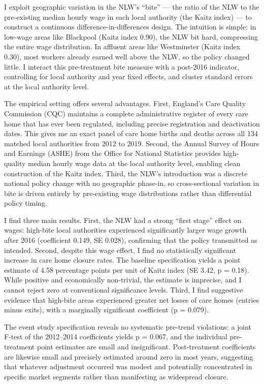 \documentclass[12pt]{article}
\begin{document}
I exploit geographic variation in the NLW's ``bite'' --- the ratio of the NLW to the pre-existing median hourly wage in each local authority (the Kaitz index) --- to construct a continuous difference-in-differences design. The intuition is simple: in low-wage areas like Blackpool (Kaitz index 0.90), the NLW bit hard, compressing the entire wage distribution. In affluent areas like Westminster (Kaitz index 0.30), most workers already earned well above the NLW, so the policy changed little. I interact this pre-treatment bite measure with a post-2016 indicator, controlling for local authority and year fixed effects, and cluster standard errors at the local authority level.

The empirical setting offers several advantages. First, England's Care Quality Commission (CQC) maintains a complete administrative register of every care home that has ever been regulated, including precise registration and deactivation dates. This gives me an exact panel of care home births and deaths across all 134 matched local authorities from 2012 to 2019. Second, the Annual Survey of Hours and Earnings (ASHE) from the Office for National Statistics provides high-quality median hourly wage data at the local authority level, enabling clean construction of the Kaitz index. Third, the NLW's introduction was a discrete national policy change with no geographic phase-in, so cross-sectional variation in bite is driven entirely by pre-existing wage distributions rather than differential policy timing.

I find three main results. First, the NLW had a strong ``first stage'' effect on wages: high-bite local authorities experienced significantly larger wage growth after 2016 (coefficient 0.149, SE 0.028), confirming that the policy transmitted as intended. Second, despite this wage effect, I find no statistically significant increase in care home closure rates. The baseline specification yields a point estimate of 4.58 percentage points per unit of Kaitz index (SE 3.42, p = 0.18). While positive and economically non-trivial, the estimate is imprecise, and I cannot reject zero at conventional significance levels. Third, I find suggestive evidence that high-bite areas experienced greater net losses of care homes (entries minus exits), with a marginally significant coefficient (p = 0.079).

The event study specification reveals no systematic pre-trend violations: a joint F-test of the 2012--2014 coefficients yields p = 0.067, and the individual pre-treatment point estimates are small and insignificant. Post-treatment coefficients are likewise small and precisely estimated around zero in most years, suggesting that whatever adjustment occurred was modest and potentially concentrated in specific market segments rather than manifesting as widespread closure.
\end{document}
